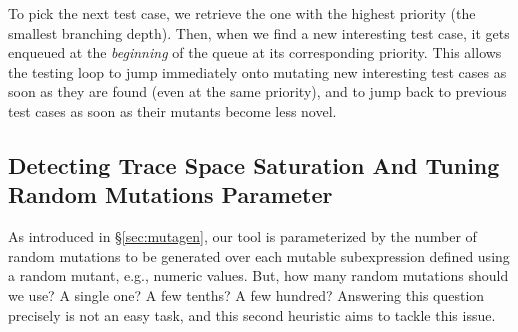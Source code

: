 \documentclass[sigconf,review,anonymous]{acmart}
\newcommand{\mutagen}{\textsc{Mutagen}\xspace}
\begin{document}
To pick the next test case, we retrieve the one with the highest priority (the
smallest branching depth).
%
Then, when we find a new interesting test case, it gets enqueued at the
\emph{beginning} of the queue at its corresponding priority.
%
This allows the testing loop to jump immediately onto mutating new interesting
test cases as soon as they are found (even at the same priority), and to jump
back to previous test cases as soon as their mutants become less novel.




\subsection{Detecting Trace Space Saturation And Tuning Random Mutations Parameter}

As introduced in \S \ref{sec:mutagen}, our tool is parameterized by the
number of random mutations to be generated over each mutable subexpression
defined using a random mutant, e.g., numeric values.
%
But, how many random mutations should we use? A single one? A few tenths? A few
hundred?
%
Answering this question precisely is not an easy task, and this second heuristic
aims to tackle this issue.
\end{document}
